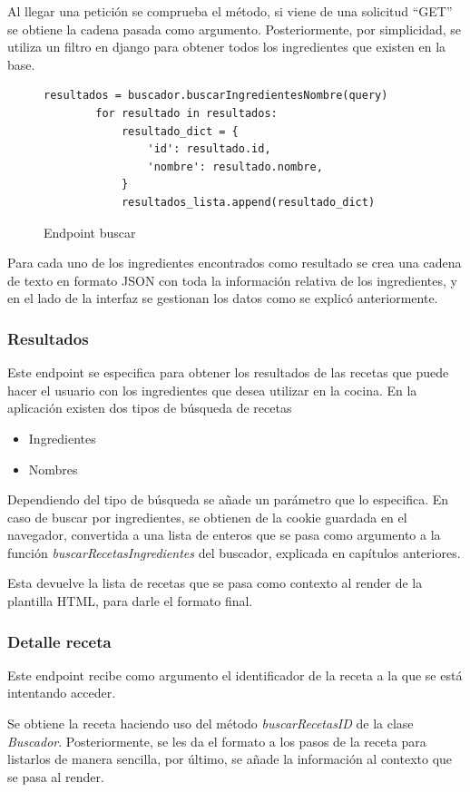 Al llegar una petición se comprueba el método, si viene de una solicitud ``GET'' se obtiene la cadena pasada como argumento. Posteriormente, por simplicidad, se utiliza un filtro en \Gls{django} para obtener todos los ingredientes que existen en la \gls{base}. 
\begin{figure}
    \centering
    \begin{lstlisting}[style=consola]
        resultados = buscador.buscarIngredientesNombre(query)
        for resultado in resultados:
            resultado_dict = {
                'id': resultado.id,
                'nombre': resultado.nombre,
            }
            resultados_lista.append(resultado_dict)
    \end{lstlisting}
    \caption{Endpoint buscar}
    \label{sni:Buscar}
\end{figure}
Para cada uno de los ingredientes encontrados como resultado se crea una cadena de texto en formato \gls{JSON} con toda la información relativa de los ingredientes, y en el lado de la \gls{interfaz} se gestionan los datos como se explicó anteriormente.

\subsubsection{Resultados}
Este \gls{endpoint} se especifica para obtener los resultados de las recetas que puede hacer el usuario con los ingredientes que desea utilizar en la cocina. En la aplicación existen dos tipos de búsqueda de recetas
\begin{itemize}
    \item Ingredientes
    \item Nombres
\end{itemize}

Dependiendo del tipo de búsqueda se añade un parámetro que lo especifica. En caso de buscar por ingredientes, se obtienen de la \gls{cookie} guardada en el navegador, convertida a una lista de enteros que se pasa como argumento a la función \textit{buscarRecetasIngredientes} del buscador, explicada en capítulos anteriores.

Esta devuelve la lista de recetas que se pasa como contexto al \gls{render} de la plantilla \gls{HTML}, para darle el formato final. 

\subsubsection{Detalle receta}
Este \gls{endpoint} recibe como argumento el identificador de la receta a la que se está intentando acceder. 

Se obtiene la receta haciendo uso del método \emph{buscarRecetasID} de la clase \emph{Buscador}. Posteriormente, se les da el formato a los pasos de la receta para listarlos de manera sencilla, por último, se añade la información al contexto que se pasa al \gls{render}.